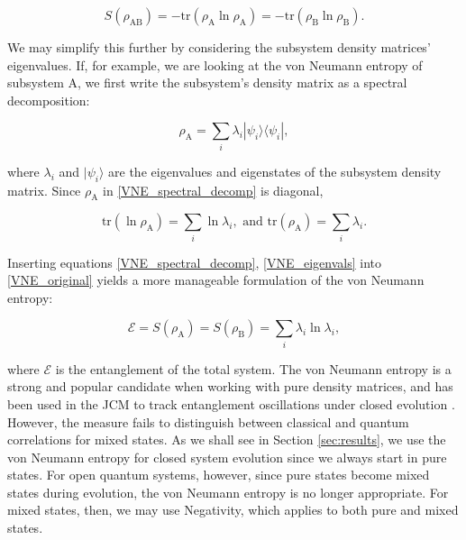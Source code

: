 \documentclass[11pt]{article}
\begin{document}
\begin{equation} \label{VNE_original}
    S(\rho_{\scriptscriptstyle \text{AB}}) = -\text{tr}(\rho_{\scriptscriptstyle \text{A}}\ln\rho_{\scriptscriptstyle \text{A}}) = -\text{tr}(\rho_{\scriptscriptstyle \text{B}}\ln\rho_{\scriptscriptstyle \text{B}}).
\end{equation}

We may simplify this further by considering the subsystem density matrices' eigenvalues. If, for example, we are looking at the von Neumann entropy of subsystem A, we first write the subsystem's density matrix as a spectral decomposition:

\begin{equation} \label{VNE_spectral_decomp}
    \rho_{\scriptscriptstyle \text{A}} = \sum_i \lambda_i|\psi_i\rangle\langle\psi_i|, 
\end{equation}

where $\lambda_i$ and $|\psi_i\rangle$ are the eigenvalues and eigenstates of the subsystem density matrix. Since $\rho_{\scriptscriptstyle \text{A}}$ in \eqref{VNE_spectral_decomp} is diagonal,

\begin{equation} \label{VNE_eigenvals}
\text{tr}(\ln\rho_{\scriptscriptstyle \text{A}}) = \sum_i \ln\lambda_i,\text{ and } \text{tr}(\rho_{\scriptscriptstyle \text{A}}) = \sum_i \lambda_i.
\end{equation}

Inserting equations \eqref{VNE_spectral_decomp}, \eqref{VNE_eigenvals} into \eqref{VNE_original} yields a more manageable formulation of the von Neumann entropy:

\begin{equation} \label{eqn:vne}
    \mathcal{E} = S(\rho_{\scriptscriptstyle \text{A}}) = S(\rho_{\scriptscriptstyle \text{B}}) = \sum_i \lambda_i\ln\lambda_i,
\end{equation}

where $\mathcal{E}$ is the entanglement of the total system. The von Neumann entropy is a strong and popular candidate when working with pure density matrices, and has been used in the JCM to track entanglement oscillations under closed evolution \cite{Entanglement2009-REE_VNapplied}. However, the measure fails to distinguish between classical and quantum correlations for mixed states. As we shall see in Section \ref{sec:results}, we use the von Neumann entropy for closed system evolution since we always start in pure states. For open quantum systems, however, since pure states become mixed states during evolution, the von Neumann entropy is no longer appropriate. For mixed states, then, we may use Negativity, which applies to both pure and mixed states.
\end{document}
